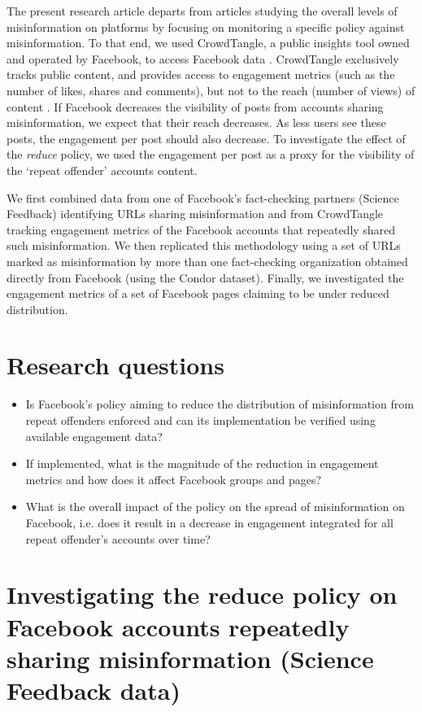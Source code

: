 \documentclass[review]{elsarticle}
\begin{document}
The present research article departs from articles studying the overall levels of misinformation on platforms by focusing on monitoring a specific policy against misinformation.
To that end, we used CrowdTangle, a public insights tool owned and operated by Facebook, to access Facebook data \citep{team2020crowdtangle}. 
CrowdTangle exclusively tracks public content, and provides access to engagement metrics (such as the number of likes, shares and comments), but not to the reach (number of views) of content \citep{helpCT}.
If Facebook decreases the visibility of posts from accounts sharing misinformation, we expect that their reach decreases.
As less users see these posts, the engagement per post should also decrease.
To investigate the effect of the {\it reduce} policy, we used the engagement per post as a proxy for the visibility of the `repeat offender' accounts content.
 
We first combined data from one of Facebook's fact-checking partners (Science Feedback) identifying URLs sharing misinformation and from CrowdTangle tracking engagement metrics of the Facebook accounts that repeatedly shared such misinformation.
We then replicated this methodology using a set of URLs marked as misinformation by more than one fact-checking organization obtained directly from Facebook (using the Condor dataset).
Finally, we investigated the engagement metrics of a set of Facebook pages claiming to be under reduced distribution.

\section{Research questions}

\begin{itemize}
\item Is Facebook’s policy aiming to reduce the distribution of misinformation from repeat offenders enforced and can its implementation be verified using available engagement data?
\item If implemented, what is the magnitude of the reduction in engagement metrics and how does it affect Facebook groups and pages?
\item What is the overall impact of the policy on the spread of misinformation on Facebook, i.e. does it result in a  decrease in engagement integrated for all repeat offender’s accounts over time?
\end{itemize}

\section{Investigating the reduce policy on Facebook accounts repeatedly sharing misinformation (Science Feedback data)}
\end{document}
